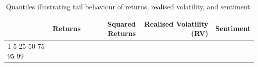 \begin{table}[htbp]
\centering
\begin{tabular}{lrrrr}
\toprule
 & Returns & Squared Returns & Realised Volatility (RV) & Sentiment \\
\midrule
1%
5%
25%
50%
75%
95%
99%
\bottomrule
\end{tabular}
\caption{Quantiles illustrating tail behaviour of returns, realised volatility, and sentiment.}
\label{tab:quantiles_tail_behaviour}
\end{table}
